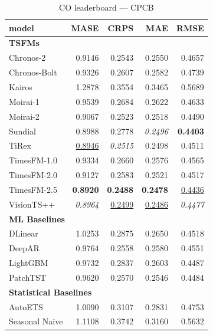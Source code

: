\begin{table}[H]
\caption{CO leaderboard --- CPCB}
\centering
\begin{small}
\begin{tabular}{lrrrr}
\toprule
model & MASE & CRPS & MAE & RMSE \\
\midrule
\multicolumn{5}{l}{\textbf{TSFMs}} \\
Chronos-2 & 0.9146 & 0.2543 & 0.2550 & 0.4657 \\
Chronos-Bolt & 0.9326 & 0.2607 & 0.2582 & 0.4739 \\
Kairos & 1.2878 & 0.3554 & 0.3465 & 0.5689 \\
Moirai-1 & 0.9539 & 0.2684 & 0.2622 & 0.4633 \\
Moirai-2 & 0.9067 & 0.2523 & 0.2518 & 0.4490 \\
Sundial & 0.8988 & 0.2778 & \textit{0.2496} & \textbf{0.4403} \\
TiRex & \underline{0.8946} & \textit{0.2515} & 0.2498 & 0.4511 \\
TimesFM-1.0 & 0.9334 & 0.2660 & 0.2576 & 0.4565 \\
TimesFM-2.0 & 0.9127 & 0.2583 & 0.2521 & 0.4517 \\
TimesFM-2.5 & \textbf{0.8920} & \textbf{0.2488} & \textbf{0.2478} & \underline{0.4436} \\
VisionTS++ & \textit{0.8964} & \underline{0.2499} & \underline{0.2486} & \textit{0.4477} \\
\midrule
\multicolumn{5}{l}{\textbf{ML Baselines}} \\
DLinear & 1.0253 & 0.2875 & 0.2650 & 0.4518 \\
DeepAR & 0.9764 & 0.2558 & 0.2580 & 0.4551 \\
LightGBM & 0.9732 & 0.2837 & 0.2603 & 0.4487 \\
PatchTST & 0.9620 & 0.2570 & 0.2546 & 0.4484 \\
\midrule
\multicolumn{5}{l}{\textbf{Statistical Baselines}} \\
AutoETS & 1.0090 & 0.3107 & 0.2831 & 0.4753 \\
Seasonal Naive & 1.1108 & 0.3742 & 0.3160 & 0.5632 \\
\bottomrule
\end{tabular}
\end{small}
\end{table}